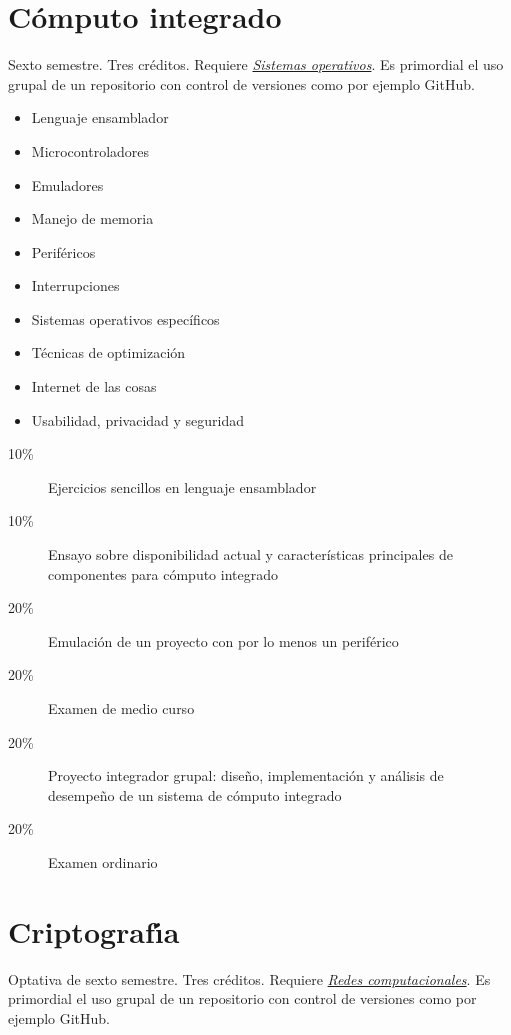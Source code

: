 \documentclass{article}
\begin{document}
\begin{multicols}{4}
\vfill\null \columnbreak

\hypertarget{ci}{\section*{C\'{o}mputo integrado}}  

Sexto semestre. Tres cr\'{e}ditos. Requiere \hyperlink{so}{\em
  Sistemas operativos}. Es primordial el uso grupal de un repositorio
con control de versiones como por ejemplo GitHub.

\begin{itemize}
\item{Lenguaje ensamblador}
\item{Microcontroladores}
\item{Emuladores}
\item{Manejo de memoria}
\item{Perif\'{e}ricos}
\item{Interrupciones}
\item{Sistemas operativos espec\'{i}ficos}
\item{T\'{e}cnicas de optimizaci\'{o}n}
\item{Internet de las cosas}  
\item{Usabilidad, privacidad y seguridad}
\end{itemize}

\begin{description}
\item[10\%]{Ejercicios sencillos en lenguaje ensamblador}
\item[10\%]{Ensayo sobre disponibilidad actual y caracter\'{i}sticas
  principales de componentes para c\'{o}mputo integrado}
\item[20\%]{Emulaci\'{o}n de un proyecto con por lo menos un perif\'{e}rico}
\item[20\%]{Examen de medio curso}  
\item[20\%]{Proyecto integrador grupal: dise\~{n}o, implementaci\'{o}n y
  an\'{a}lisis de desempe\~{n}o de un sistema de c\'{o}mputo integrado}
\item[20\%]{Examen ordinario}
\end{description}  

\newpage

\hypertarget{cr}{\section*{Criptograf\'{\i}a}}

Optativa de sexto semestre. Tres cr\'{e}ditos. Requiere
\hyperlink{rc}{\em Redes computacionales}. Es primordial el uso grupal
de un repositorio con control de versiones como por ejemplo GitHub.


\end{multicols}
\end{document}
